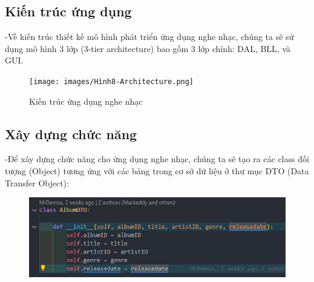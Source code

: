 \documentclass[a4paper]{article}
\begin{document}
\subsection{Kiến trúc ứng dụng}
\begin{flushleft}
	-Về kiến trúc thiết kế mô hình phát triển ứng dụng nghe nhạc, chúng ta sẽ sử dụng mô hình 3 lớp (3-tier architecture)
	bao gồm 3 lớp chính: DAL, BLL, và GUI.
	\begin{figure}[h]
		\centering
		\texttt{[image: images/Hình8-Architecture.png]}
		\caption{Kiến trúc ứng dụng nghe nhạc}
	\end{figure}
\end{flushleft}

\subsection{Xây dựng chức năng}
\begin{flushleft}
	-Để xây dựng chức năng cho ứng dụng nghe nhạc, chúng ta sẽ tạo ra các class đối tượng (Object) tương ứng với các bảng trong cơ sở dữ liệu ở thư mục DTO (Data Transfer Object):
	\begin{figure}[h]
		\centering
		\includegraphics[width=\textwidth]{images/AlbumDTO.png}
	\end{figure}
\end{flushleft}
\end{document}
